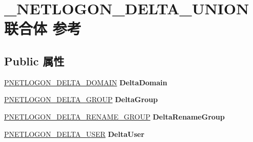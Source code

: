 \hypertarget{union___n_e_t_l_o_g_o_n___d_e_l_t_a___u_n_i_o_n}{}\section{\+\_\+\+N\+E\+T\+L\+O\+G\+O\+N\+\_\+\+D\+E\+L\+T\+A\+\_\+\+U\+N\+I\+O\+N联合体 参考}
\label{union___n_e_t_l_o_g_o_n___d_e_l_t_a___u_n_i_o_n}
\subsection*{Public 属性}
\begin{DoxyCompactItemize}
\item 
\mbox{\label{union___n_e_t_l_o_g_o_n___d_e_l_t_a___u_n_i_o_n_aad4683704c395fd5c7e11bb222082c01}} 
\hyperlink{struct___n_e_t_l_o_g_o_n___d_e_l_t_a___d_o_m_a_i_n}{P\+N\+E\+T\+L\+O\+G\+O\+N\+\_\+\+D\+E\+L\+T\+A\+\_\+\+D\+O\+M\+A\+IN} {\bfseries Delta\+Domain}
\item 
\mbox{\label{union___n_e_t_l_o_g_o_n___d_e_l_t_a___u_n_i_o_n_a5e1ea7df81baf95722d2f3ffcfafbcef}} 
\hyperlink{struct___n_e_t_l_o_g_o_n___d_e_l_t_a___g_r_o_u_p}{P\+N\+E\+T\+L\+O\+G\+O\+N\+\_\+\+D\+E\+L\+T\+A\+\_\+\+G\+R\+O\+UP} {\bfseries Delta\+Group}
\item 
\mbox{\label{union___n_e_t_l_o_g_o_n___d_e_l_t_a___u_n_i_o_n_ad9e679fffdcac6c3f314850614123cfb}} 
\hyperlink{struct___n_e_t_l_o_g_o_n___d_e_l_t_a___r_e_n_a_m_e___g_r_o_u_p}{P\+N\+E\+T\+L\+O\+G\+O\+N\+\_\+\+D\+E\+L\+T\+A\+\_\+\+R\+E\+N\+A\+M\+E\+\_\+\+G\+R\+O\+UP} {\bfseries Delta\+Rename\+Group}
\item 
\mbox{\label{union___n_e_t_l_o_g_o_n___d_e_l_t_a___u_n_i_o_n_a2070f9e5f276fa17c1619020b34d1cdf}} 
\hyperlink{struct___n_e_t_l_o_g_o_n___d_e_l_t_a___u_s_e_r}{P\+N\+E\+T\+L\+O\+G\+O\+N\+\_\+\+D\+E\+L\+T\+A\+\_\+\+U\+S\+ER} {\bfseries Delta\+User}
\item 
\mbox{\label{union___n_e_t_l_o_g_o_n___d_e_l_t_a___u_n_i_o_n_a2975183a7abc8953f96dbfefb58f808c}} 

\end{DoxyCompactItemize}
